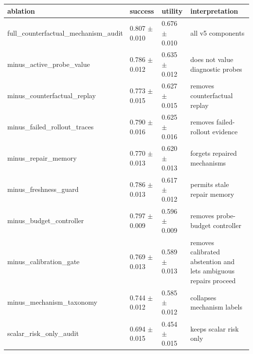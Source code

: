 \begin{tabular}{llll}
\toprule
ablation & success & utility & interpretation \\
\midrule
full\_counterfactual\_mechanism\_audit & 0.807 $\pm$ 0.010 & 0.676 $\pm$ 0.010 & all v5 components \\
minus\_active\_probe\_value & 0.786 $\pm$ 0.012 & 0.635 $\pm$ 0.012 & does not value diagnostic probes \\
minus\_counterfactual\_replay & 0.773 $\pm$ 0.015 & 0.627 $\pm$ 0.015 & removes counterfactual replay \\
minus\_failed\_rollout\_traces & 0.790 $\pm$ 0.016 & 0.625 $\pm$ 0.016 & removes failed-rollout evidence \\
minus\_repair\_memory & 0.770 $\pm$ 0.013 & 0.620 $\pm$ 0.013 & forgets repaired mechanisms \\
minus\_freshness\_guard & 0.786 $\pm$ 0.013 & 0.617 $\pm$ 0.012 & permits stale repair memory \\
minus\_budget\_controller & 0.797 $\pm$ 0.009 & 0.596 $\pm$ 0.009 & removes probe-budget controller \\
minus\_calibration\_gate & 0.769 $\pm$ 0.013 & 0.589 $\pm$ 0.013 & removes calibrated abstention and lets ambiguous repairs proceed \\
minus\_mechanism\_taxonomy & 0.744 $\pm$ 0.012 & 0.585 $\pm$ 0.012 & collapses mechanism labels \\
scalar\_risk\_only\_audit & 0.694 $\pm$ 0.015 & 0.454 $\pm$ 0.015 & keeps scalar risk only \\
\bottomrule
\end{tabular}
